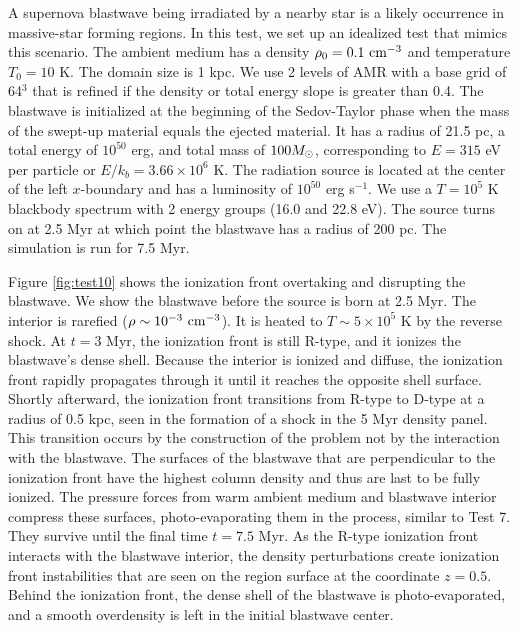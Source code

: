 \documentclass[apj,onecolumn]{emulateapj}
\begin{document}
A supernova blastwave being irradiated by a nearby star is a likely
occurrence in massive-star forming regions.  In this test, we set up an
idealized test that mimics this scenario.  The ambient medium has a
density $\rho_0 = 0.1~\cubecm$ and temperature $T_0 = 10$ K.  The
domain size is 1 kpc.  We use 2 levels of AMR with a base grid of
64$^3$ that is refined if the density or total energy slope is greater
than 0.4.  The blastwave is initialized at the beginning of the
Sedov-Taylor phase when the mass of the swept-up material equals the
ejected material.  It has a radius of 21.5 pc, a total energy of
$10^{50}$ erg, and total mass of $100 \Ms$, corresponding to $E = 315$
eV per particle or $E/k_b = 3.66 \times 10^6$ K.  The radiation source
is located at the center of the left $x$-boundary and has a luminosity
of $10^{50}$ erg s$^{-1}$.  We use a $T=10^5$ K blackbody spectrum
with 2 energy groups (16.0 and 22.8 eV).  The source turns on at 2.5
Myr at which point the blastwave has a radius of 200 pc.  The
simulation is run for 7.5 Myr.

Figure \ref{fig:test10} shows the ionization front overtaking and
disrupting the blastwave.  We show the blastwave before the source is
born at 2.5 Myr.  The interior is rarefied ($\rho \sim
10^{-3}~\cubecm$).  It is heated to $T \sim 5 \times 10^5$ K by the
reverse shock.  At $t = 3$ Myr, the ionization front is still R-type,
and it ionizes the blastwave's dense shell.  Because the interior is
ionized and diffuse, the ionization front rapidly propagates through
it until it reaches the opposite shell surface.  Shortly afterward,
the ionization front transitions from R-type to D-type at a radius of
0.5 kpc, seen in the formation of a shock in the 5 Myr density panel.
This transition occurs by the construction of the problem not by the
interaction with the blastwave.  The surfaces of the blastwave that
are perpendicular to the ionization front have the highest column
density and thus are last to be fully ionized.  The pressure forces
from warm ambient medium and blastwave interior compress these
surfaces, photo-evaporating them in the process, similar to Test 7.
They survive until the final time $t = 7.5$ Myr.  As the R-type
ionization front interacts with the blastwave interior, the density
perturbations create ionization front instabilities
\citep{Whalen08_Instab} that are seen on the  region surface
at the coordinate $z=0.5$.  Behind the ionization front, the dense
shell of the blastwave is photo-evaporated, and a smooth overdensity
is left in the initial blastwave center.
\end{document}
